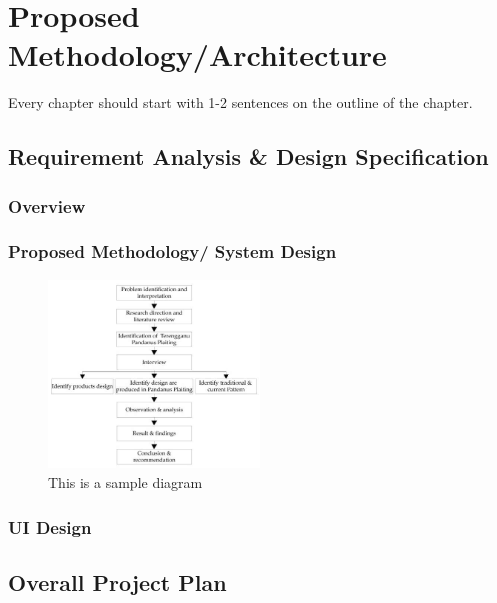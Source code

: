 \chapter{Proposed Methodology/Architecture}

\begin{center}


Every chapter should start with 1-2 sentences on the outline of the chapter.
    
\end{center}

\begin{flushleft}
\section{Requirement Analysis \& Design Specification}
\subsection{Overview}
\subsection{Proposed Methodology/ System Design}

\begin{figure}[h] %
    \centering
    \includegraphics[width=0.5\textwidth]{figures/flowdiagram.png} %
    \caption{This is a sample diagram}
    \label{fig:sample}
\end{figure}

\subsection{UI Design}

\section{Overall Project Plan}

\end{flushleft}